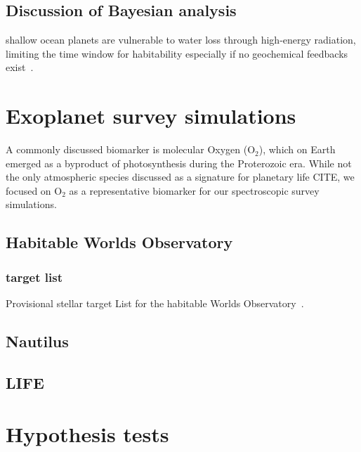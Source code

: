 \documentclass[twocolumn]{aastex631}
\begin{document}
\subsection{Discussion of Bayesian analysis}

\begin{note}
    shallow ocean planets are vulnerable to water loss through high-energy radiation, limiting the time window for habitability especially if no geochemical feedbacks exist~\citep{Kite2018}.
\end{note}










\section{Exoplanet survey simulations}
A commonly discussed biomarker is molecular Oxygen (O$_2$), which on Earth emerged as a byproduct of photosynthesis during the Proterozoic era.
While not the only atmospheric species discussed as a signature for planetary life CITE, we focused on O$_2$ as a representative biomarker for our spectroscopic survey simulations.


\subsection{Habitable Worlds Observatory}
\subsubsection{target list}
Provisional stellar target List for the habitable Worlds Observatory~\citep{Mamajek2023}.

\subsection{Nautilus}
\subsection{LIFE} %

\section{Hypothesis tests}
\label{sec:hypotests}
\end{document}
